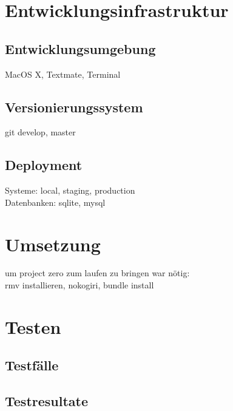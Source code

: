 \section{Entwicklungsinfrastruktur}

\subsection{Entwicklungsumgebung}
MacOS X, Textmate, Terminal

\subsection{Versionierungssystem}
git develop, master

\subsection{Deployment}
Systeme: local, staging, production\\
Datenbanken: sqlite, mysql

\section{Umsetzung}

um project zero zum laufen zu bringen war nötig:\\
rmv installieren, nokogiri, bundle install

\section{Testen}

\subsection{Testfälle}

\subsection{Testresultate}